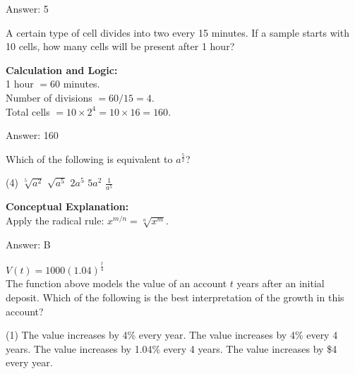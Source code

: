 \documentclass[11pt,paper=a4,answers]{exam}
\begin{document}
\begin{questions}
\begin{solution}
\vspace{25pt}

Answer: \colorbox{yellow!100}{5}
\end{solution}

\vspace{40pt}

\question
A certain type of cell divides into two every 15 minutes. If a sample starts with 10 cells, how many cells will be present after 1 hour?

\begin{solution}
\textbf{Calculation and Logic:} \\
1 hour $= 60$ minutes. \\
Number of divisions $= 60 / 15 = 4$. \\
Total cells $= 10 \times 2^4 = 10 \times 16 = 160$.

\vspace{25pt}

Answer: \colorbox{yellow!100}{160}
\end{solution}

\vspace{40pt}

\question
Which of the following is equivalent to $a^{\frac{5}{2}}$?
\begin{tasks}(4)
    \task $\sqrt[5]{a^2}$
    \task $\sqrt{a^5}$
    \task $2a^5$
    \task $5a^2$
    \task $\frac{1}{a^5}$
\end{tasks}

\begin{solution}
\textbf{Conceptual Explanation:} \\
Apply the radical rule: $x^{m/n} = \sqrt[n]{x^m}$.

\vspace{25pt}

Answer: \colorbox{yellow!100}{B}
\end{solution}

\vspace{40pt}

\question
$V(t) = 1000(1.04)^{\frac{t}{4}}$ \\
The function above models the value of an account $t$ years after an initial deposit. Which of the following is the best interpretation of the growth in this account?
\begin{tasks}(1)
    \task The value increases by 4\% every year.
    \task The value increases by 4\% every 4 years.
    \task The value increases by 1.04\% every 4 years.
    \task The value increases by \$4 every year.
\end{tasks}


\end{questions}
\end{document}
